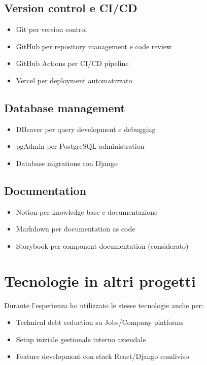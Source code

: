 \subsection{Version control e CI/CD}
\begin{itemize}
  \item Git per version control
  \item GitHub per repository management e code review
  \item GitHub Actions per CI/CD pipeline
  \item Vercel per deployment automatizzato
\end{itemize}

\subsection{Database management}
\begin{itemize}
  \item DBeaver per query development e debugging
  \item pgAdmin per PostgreSQL administration
  \item Database migrations con Django
\end{itemize}

\subsection{Documentation}
\begin{itemize}
  \item Notion per knowledge base e documentazione
  \item Markdown per documentation as code
  \item Storybook per component documentation (considerato)
\end{itemize}

\section{Tecnologie in altri progetti}
Durante l'esperienza ho utilizzato le stesse tecnologie anche per:
\begin{itemize}
  \item Technical debt reduction su Jobs/Company platforms
  \item Setup iniziale gestionale interno aziendale
  \item Feature development con stack React/Django condiviso
\end{itemize}

